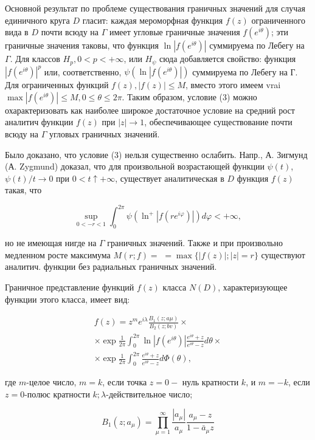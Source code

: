 \documentclass[10pt]{article}
\begin{document}
Основной результат по проблеме существования граничных значений для случая единичного круга $D$ гласит: каждая мероморфная функция $f(z)$ ограниченного вида в $D$ почти всюду на $\Gamma$ имеет угловые граничные значения $f\left(e^{i \theta}\right)$; эти граничные значения таковы, что функция $\ln \left|f\left(e^{i \theta}\right)\right|$ суммируема по Лебегу на $\Gamma$. Для классов $H_{p}, 0<p<+\infty$, или $H_{\psi}$ сюда добавляется свойство: функция $\left|f\left(e^{i \theta}\right)\right|^{p}$ или, соответственно, $\psi\left(\ln \left|f\left(e^{i \theta}\right)\right|\right)$ суммируема по Лебегу на Г. Для ограниченных функций $f(z),|f(z)| \leqslant M$, вместо этого имеем vrai $\max \left|f\left(e^{i \theta}\right)\right| \leqslant M, 0 \leqslant \theta \leqslant 2 \pi$. Таким образом, условие (3) можно охарактеризовать как наиболее широкое достаточное условие на средний рост аналитич функции $f(z)$ при $|z| \rightarrow 1$, обеспечивающее существование почти всюду на $\Gamma$ угловых граничных значений.



Было доказано, что условие (3) нельзя существенно ослабить. Напр., А. Зигмунд (А. Zygmund) доказал, что для произвольной возрастающей функции $\psi(t)$, $\psi(t) / t \rightarrow 0$ при $0<t \uparrow+\infty$, существует аналитическая в $D$ функция $f(z)$ такая, что



\[

\sup _{0<-r<1} \int_{0}^{2 \pi} \psi\left(\ln ^{+}\left|f\left(r e^{i \varphi}\right)\right|\right) d \varphi<+\infty,

\]



но не имеющая нигде на $\Gamma$ граничных значений. Также и при произвольно медленном росте максимума $M(r ; f)=$ $=\max \{|f(z)| ;|z|=r\}$ существуют аналитич. функции без радиальных граничных значений.



Граничное представление функций $f(z)$ класса $N(D)$, характеризующее функции этого класса, имеет вид:



\[

\begin{gathered}

f(z)=z^{m} e^{i \lambda} \frac{B_{1}(z ; a \mu)}{B_{2}(z ; b v)} \times \\

\times \exp \frac{1}{2 \pi} \int_{0}^{2 \pi} \ln \left|f\left(e^{i \theta}\right)\right| \frac{e^{i \theta}+z}{e^{i \theta}-z} d \theta \times \\

\times \exp \frac{1}{2 \pi} \int_{0}^{2 \pi} \frac{e^{i \theta}+z}{e^{i \theta}-z} d \Phi(\theta),

\end{gathered}

\]



где $m$-целое число, $m=k$, если точка $z=0-$ нуль кратности $k$, и $m=-k$, если $z=0$-полюс кратности $k ; \lambda$-действительное число;



\[

B_{1}\left(z ; a_{\mu}\right)=\prod_{\mu=1}^{\infty} \frac{\left|a_{\mu}\right|}{a_{\mu}} \frac{a_{\mu}-z}{1-\bar{a}_{\mu} z}

\]
\end{document}
